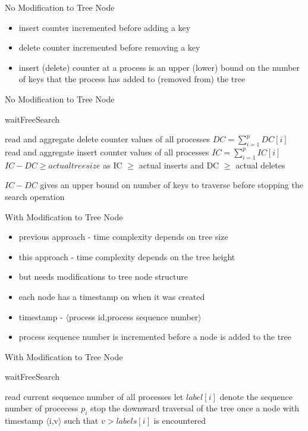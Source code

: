 \begin{frame}[c]{No Modification to Tree Node}
\begin{itemize}
\item insert counter incremented before adding a key
\item delete counter incremented before removing a key
\item insert (delete) counter at a process is an upper (lower) bound on the number of keys that the process has added to (removed from) the tree
\end{itemize}
\end{frame}

\begin{frame}[c]{No Modification to Tree Node}
\renewcommand{\thealgocf}{}
\begin{algorithm}[H]
\caption{\tiny waitFreeSearch}
read and aggregate delete counter values of all processes $DC = \sum\limits_{i=1}^p DC[i]$\;
read and aggregate insert counter values of all processes $IC = \sum\limits_{i=1}^p IC[i]$\;
$IC-DC \geq actual tree size$ as IC $\geq$ actual inserts and DC $\geq$ actual deletes\;
\end{algorithm}
$IC-DC$ gives an upper bound on number of keys to traverse before stopping the search operation
\end{frame}

\begin{frame}[c]{With Modification to Tree Node}
\begin{itemize}
\item  previous approach - time complexity depends on tree size
\item this approach - time complexity depends on the tree height
\item but needs modifications to tree node structure
\item each node has a timestamp on when it was created 
\item timestamp - $\langle$process id,process sequence number$\rangle$
\item process sequence number is incremented before a node is added to the tree
\end{itemize}
\end{frame}

\begin{frame}[c]{With Modification to Tree Node}
\renewcommand{\thealgocf}{}
\begin{algorithm}[H]
\caption{\tiny waitFreeSearch}
read current sequence number of all processes\;
let $label[i]$ denote the sequence number of procecess $p_i$\;
stop the downward traversal of the tree once a node with timestamp $\langle$i,v$\rangle$ such that $v > labels[i]$ is encountered\;
\end{algorithm}
\end{frame}